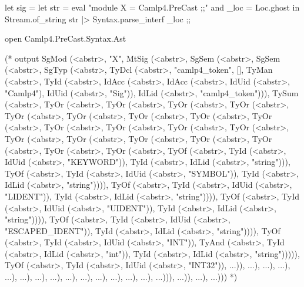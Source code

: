 \begin{bluecode}
let sig = 
  let str = eval "module X = Camlp4.PreCast ;;" 
  and _loc = Loc.ghost in 
  Stream.of_string str |> Syntax.parse_interf  _loc ;;

open Camlp4.PreCast.Syntax.Ast

(* output
SgMod (<abstr>, "X",
 MtSig (<abstr>,
  SgSem (<abstr>,
   SgSem (<abstr>,
    SgTyp (<abstr>,
     TyDcl (<abstr>, "camlp4_token", [],
      TyMan (<abstr>,
       TyId (<abstr>,
        IdAcc (<abstr>,
         IdAcc (<abstr>, IdUid (<abstr>, "Camlp4"), IdUid (<abstr>, "Sig")),
         IdLid (<abstr>, "camlp4_token"))),
       TySum (<abstr>,
        TyOr (<abstr>,
         TyOr (<abstr>,
          TyOr (<abstr>,
           TyOr (<abstr>,
            TyOr (<abstr>,
             TyOr (<abstr>,
              TyOr (<abstr>,
               TyOr (<abstr>,
                TyOr (<abstr>,
                 TyOr (<abstr>,
                  TyOr (<abstr>,
                   TyOr (<abstr>,
                    TyOr (<abstr>,
                     TyOr (<abstr>,
                      TyOr (<abstr>,
                       TyOr (<abstr>,
                        TyOr (<abstr>,
                         TyOr (<abstr>,
                          TyOr (<abstr>,
                           TyOr (<abstr>,
                            TyOf (<abstr>,
                             TyId (<abstr>, IdUid (<abstr>, "KEYWORD")),
                             TyId (<abstr>, IdLid (<abstr>, "string"))),
                            TyOf (<abstr>,
                             TyId (<abstr>, IdUid (<abstr>, "SYMBOL")),
                             TyId (<abstr>, IdLid (<abstr>, "string")))),
                           TyOf (<abstr>,
                            TyId (<abstr>, IdUid (<abstr>, "LIDENT")),
                            TyId (<abstr>, IdLid (<abstr>, "string")))),
                          TyOf (<abstr>,
                           TyId (<abstr>, IdUid (<abstr>, "UIDENT")),
                           TyId (<abstr>, IdLid (<abstr>, "string")))),
                         TyOf (<abstr>,
                          TyId (<abstr>, IdUid (<abstr>, "ESCAPED_IDENT")),
                          TyId (<abstr>, IdLid (<abstr>, "string")))),
                        TyOf (<abstr>,
                         TyId (<abstr>, IdUid (<abstr>, "INT")),
                         TyAnd (<abstr>,
                          TyId (<abstr>, IdLid (<abstr>, "int")),
                          TyId (<abstr>, IdLid (<abstr>, "string"))))),
                       TyOf (<abstr>,
                        TyId (<abstr>, IdUid (<abstr>, "INT32")), ...)),
                      ...),
                     ...),
                    ...),
                   ...),
                  ...),
                 ...),
                ...),
               ...),
              ...),
             ...),
            ...),
           ...),
          ...),
         ...))),
      ...)),
    ...),
   ...)))
*)
\end{bluecode}



